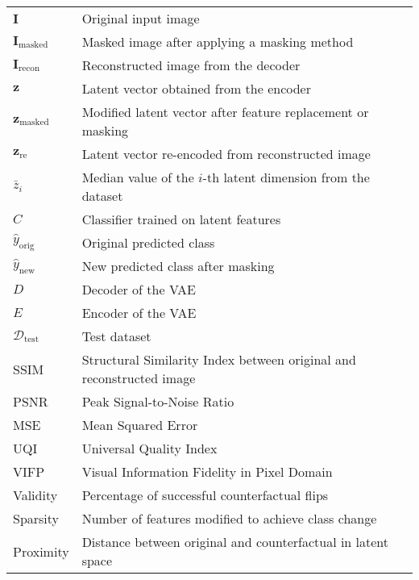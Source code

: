 
\begin{center}
\renewcommand{\arraystretch}{1.3}
\begin{tabular}{ll}
$ \mathbf{I} $ & Original input image \\
$ \mathbf{I}_{\text{masked}} $ & Masked image after applying a masking method \\
$ \mathbf{I}_{\text{recon}} $ & Reconstructed image from the decoder \\
$ \mathbf{z} $ & Latent vector obtained from the encoder \\
$ \mathbf{z}_{\text{masked}} $ & Modified latent vector after feature replacement or masking \\
$ \mathbf{z}_{\text{re}} $ & Latent vector re-encoded from reconstructed image \\
$ \bar{z}_i $ & Median value of the $i$-th latent dimension from the dataset \\
$ C $ & Classifier trained on latent features \\
$ \hat{y}_{\text{orig}} $ & Original predicted class \\
$ \hat{y}_{\text{new}} $ & New predicted class after masking \\
$ D $ & Decoder of the VAE \\
$ E $ & Encoder of the VAE \\
$ \mathcal{D}_{\text{test}} $ & Test dataset \\
SSIM & Structural Similarity Index between original and reconstructed image \\
PSNR & Peak Signal-to-Noise Ratio \\
MSE & Mean Squared Error \\
UQI & Universal Quality Index \\
VIFP & Visual Information Fidelity in Pixel Domain \\
Validity & Percentage of successful counterfactual flips \\
Sparsity & Number of features modified to achieve class change \\
Proximity & Distance between original and counterfactual in latent space \\
\end{tabular}
\end{center}
